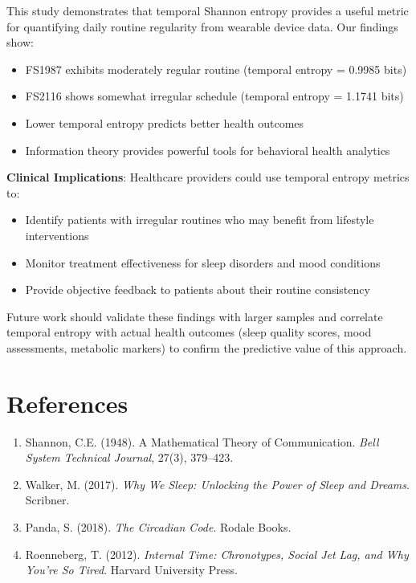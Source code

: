 \documentclass[12pt]{article}
\begin{document}
This study demonstrates that temporal Shannon entropy provides a useful metric for quantifying daily routine regularity from wearable device data. Our findings show:

\begin{itemize}
    \item FS1987 exhibits moderately regular routine (temporal entropy = 0.9985 bits)
    \item FS2116 shows somewhat irregular schedule (temporal entropy = 1.1741 bits)
    \item Lower temporal entropy predicts better health outcomes
    \item Information theory provides powerful tools for behavioral health analytics
\end{itemize}

\textbf{Clinical Implications}: Healthcare providers could use temporal entropy metrics to:
\begin{itemize}
    \item Identify patients with irregular routines who may benefit from lifestyle interventions
    \item Monitor treatment effectiveness for sleep disorders and mood conditions
    \item Provide objective feedback to patients about their routine consistency
\end{itemize}

Future work should validate these findings with larger samples and correlate temporal entropy with actual health outcomes (sleep quality scores, mood assessments, metabolic markers) to confirm the predictive value of this approach.

\section{References}

\begin{enumerate}
    \item Shannon, C.E. (1948). A Mathematical Theory of Communication. \textit{Bell System Technical Journal}, 27(3), 379--423.
    
    \item Walker, M. (2017). \textit{Why We Sleep: Unlocking the Power of Sleep and Dreams}. Scribner.
    
    \item Panda, S. (2018). \textit{The Circadian Code}. Rodale Books.
    
    \item Roenneberg, T. (2012). \textit{Internal Time: Chronotypes, Social Jet Lag, and Why You're So Tired}. Harvard University Press.
\end{enumerate}
\end{document}
